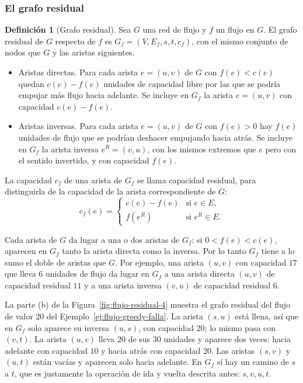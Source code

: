 \documentclass[12pt, spanish, oneside, openany]{book}
\theoremstyle{uprightplain}
\theoremstyle{definition}
\newtheorem{definicion}[teorema]{Definición}
\theoremstyle{remark}
\theoremstyle{definition}
\begin{document}
\subsubsection{El grafo residual}

\begin{definicion}[Grafo residual]
\label{def:grafo-residual}
Sea $G$ una red de flujo y $f$ un flujo en $G$. El grafo residual de $G$ respecto de $f$ es $G_f=(V,E_f,s,t,c_f)$, con el mismo conjunto de nodos que $G$ y las aristas siguientes.
\begin{itemize}
    \item Aristas directas. Para cada arista $e=(u,v)$ de $G$ con $f(e)<c(e)$ quedan $c(e)-f(e)$ unidades de capacidad libre por las que se podría empujar más flujo hacia adelante. Se incluye en $G_f$ la arista $e=(u,v)$ con capacidad $c(e)-f(e)$.
    \item Aristas inversas. Para cada arista $e=(u,v)$ de $G$ con $f(e)>0$ hay $f(e)$ unidades de flujo que se podrían deshacer empujando hacia atrás. Se incluye en $G_f$ la arista inversa $e^{R}=(v,u)$, con los mismos extremos que $e$ pero con el sentido invertido, y con capacidad $f(e)$.
\end{itemize}
La capacidad $c_f$ de una arista de $G_f$ se llama capacidad residual, para distinguirla de la capacidad de la arista correspondiente de $G$:
\[
c_f(e)=\begin{cases}
c(e)-f(e) & \text{si } e\in E,\\
f(e^{R}) & \text{si } e^{R}\in E.
\end{cases}
\]
\end{definicion}

Cada arista de $G$ da lugar a una o dos aristas de $G_f$: si $0<f(e)<c(e)$, aparecen en $G_f$ tanto la arista directa como la inversa. Por lo tanto $G_f$ tiene a lo sumo el doble de aristas que $G$. Por ejemplo, una arista $(u,v)$ con capacidad $17$ que lleva $6$ unidades de flujo da lugar en $G_f$ a una arista directa $(u,v)$ de capacidad residual $11$ y a una arista inversa $(v,u)$ de capacidad residual $6$.

La parte (b) de la Figura~\ref{fig:flujo-residual-4} muestra el grafo residual del flujo de valor $20$ del Ejemplo~\ref{ej:flujo-greedy-falla}. La arista $(s,u)$ está llena, así que en $G_f$ solo aparece su inversa $(u,s)$, con capacidad $20$; lo mismo pasa con $(v,t)$. La arista $(u,v)$ lleva $20$ de sus $30$ unidades y aparece dos veces: hacia adelante con capacidad $10$ y hacia atrás con capacidad $20$. Las aristas $(s,v)$ y $(u,t)$ están vacías y aparecen solo hacia adelante. En $G_f$ sí hay un camino de $s$ a $t$, que es justamente la operación de ida y vuelta descrita antes: $s,v,u,t$.
\end{document}
